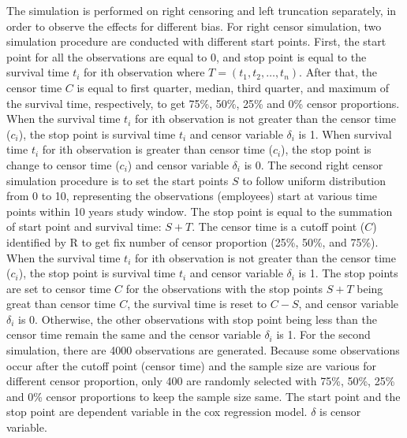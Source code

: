 \documentclass[12pt,letterpaper]{article}
\begin{document}
 The simulation is performed on right censoring and left truncation separately, in order to observe the effects for different bias.
 For right censor simulation, two simulation procedure are conducted with different start points. First, the start point for all the observations are equal to 0, and stop point is equal to the survival time $t_i$ for ith observation where $T=(t_1, t_2, \ldots, t_n)$. After that, the censor time $C$ is equal to first quarter, median, third quarter, and maximum of the survival time, respectively, to get 75\%, 50\%, 25\% and 0\% censor proportions. When the survival time $t_i$ for ith observation is not greater than the censor time ($c_i$), the stop point is survival time $t_i$ and censor variable $\delta_i$ is 1. When survival time $t_i$ for ith observation is greater than censor time ($c_i$), the stop point is change to censor time ($c_i$) and censor variable $\delta_i$ is 0. The second right censor simulation procedure is to set the start points $S$ to follow uniform distribution from 0 to 10, representing the observations (employees) start at various time points within 10 years study window. The stop point is equal to the summation of start point and survival time: $S+T$. The censor time is a cutoff point ($C$) identified by R to get fix number of censor proportion (25\%, 50\%, and 75\%).  When the survival time $t_i$ for ith observation is not greater than the censor time ($c_i$), the stop point is survival time $t_i$ and censor variable $\delta_i$ is 1. The stop points are set to censor time $C$ for the observations with the stop points $S+T$ being great than censor time $C$, the survival time is reset to $C-S$, and censor variable $\delta_i$ is 0. Otherwise, the other observations with stop point being less than the censor time remain the same and the censor variable $\delta_i$ is 1. For the second simulation, there are 4000 observations are generated. Because some observations occur after the cutoff point (censor time) and the sample size are various for different censor proportion, only 400 are randomly selected with 75\%, 50\%, 25\% and 0\% censor proportions to keep the sample size same. The start point and the stop point are dependent variable in the cox regression model. $\delta$ is censor variable.
\end{document}
